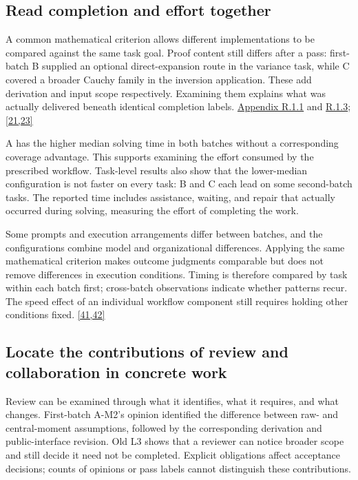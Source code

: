 \subsection[Read completion and effort together]{\texorpdfstring{\protect\hypertarget{section-6-1}{}Read completion and effort together}{Read completion and effort together}}
A common mathematical criterion allows different implementations to be compared against the same task goal. Proof content still differs after a pass: first-batch B supplied an optional direct-expansion route in the variance task, while C covered a broader Cauchy family in the inversion application. These add derivation and input scope respectively. Examining them explains what was actually delivered beneath identical completion labels. \href{en-appendix.pdf\#r1-1}{Appendix R.1.1} and \href{en-appendix.pdf\#r1-3}{R.1.3}; \hyperlink{ref-21}{\mbox{[21,23]}}

A has the higher median solving time in both batches without a corresponding coverage advantage. This supports examining the effort consumed by the prescribed workflow. Task-level results also show that the lower-median configuration is not faster on every task: B and C each lead on some second-batch tasks. The reported time includes assistance, waiting, and repair that actually occurred during solving, measuring the effort of completing the work.

Some prompts and execution arrangements differ between batches, and the configurations combine model and organizational differences. Applying the same mathematical criterion makes outcome judgments comparable but does not remove differences in execution conditions. Timing is therefore compared by task within each batch first; cross-batch observations indicate whether patterns recur. The speed effect of an individual workflow component still requires holding other conditions fixed. \hyperlink{ref-41}{\mbox{[41,42]}}

\subsection[Locate the contributions of review and collaboration in concrete work]{\texorpdfstring{\protect\hypertarget{section-6-2}{}Locate the contributions of review and collaboration in concrete work}{Locate the contributions of review and collaboration in concrete work}}
Review can be examined through what it identifies, what it requires, and what changes. First-batch A-M2's opinion identified the difference between raw- and central-moment assumptions, followed by the corresponding derivation and public-interface revision. Old L3 shows that a reviewer can notice broader scope and still decide it need not be completed. Explicit obligations affect acceptance decisions; counts of opinions or pass labels cannot distinguish these contributions.

